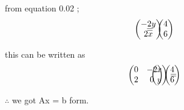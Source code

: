\documentclass[journal,12pt,twocolumn]{IEEEtran}
\theoremstyle{remark}
\newcommand{\myvec}[1]{\ensuremath{\begin{pmatrix}#1\end{pmatrix}}}
\numberwithin{equation}{subsection}
\begin{document}
      \vspace{1cm}
       from equation 0.02 ;
     \begin{align}
&\ \myvec{-2y\\2x }& \hspace{-1cm} =
&\ \myvec{4\\6} & 
\end{align} 

\vspace{1cm}
      this can be written as 
   \begin{align}
&\ \myvec{0 & -2\\2 & 0}& \hspace{-1cm}
\ \myvec{x\\y}&  = \hspace{-1cm}
&\ \myvec{4\\6} & 
\end{align} 

       \vspace{1cm}
     $\therefore$ we got Ax = b form.  
\end{document}
